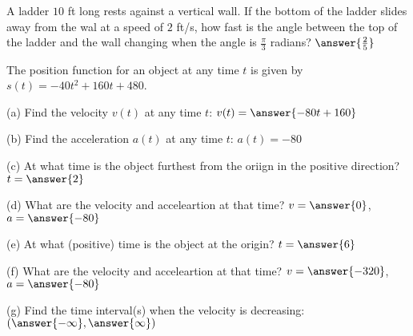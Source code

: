 \documentclass{ximera}
\begin{document}
\begin{exercise}
A ladder $10$ ft long rests against a vertical wall. If the bottom of the ladder slides away from the wal at a speed of $2$ ft/s, how fast is the angle between the top of the ladder and the wall changing when the angle is $\frac{\pi}{3}$ radians?  $\answer{\frac{2}{5}}$
\end{exercise}

\begin{exercise}
The position function for an object at any time $t$ is given by $s(t)=-40t^2+160t+480$.

(a) Find the velocity $v(t)$ at any time $t$: $v(t)=\answer{-80t+160}$

(b) Find the acceleration $a(t)$ at any time $t$: $a(t)=-80$

(c) At what time is the object furthest from the oriign in the positive direction? $t=\answer{2}$

(d) What are the velocity and acceleartion at that time? $v=\answer{0}$, $a=\answer{-80}$

(e) At what (positive) time is the object at the origin? $t=\answer{6}$

(f) What are the velocity and acceleartion at that time? $v=\answer{-320}$, $a=\answer{-80}$

(g) Find the time interval(s) when the velocity is decreasing: $(\answer{-\infty},\answer{\infty})$
\end{exercise}
\end{document}
